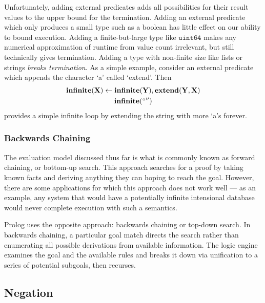Unfortunately, adding external predicates adds all possibilities for their result values to the upper bound for the termination.
Adding an external predicate which only produces a small type such as a boolean has little effect on our ability to bound execution.
Adding a finite-but-large type like $\texttt{uint64}$ makes any numerical approximation of runtime from value count irrelevant, but still technically gives termination.
Adding a type with non-finite size like lists or strings \emph{breaks termination}.
As a simple example, consider an external predicate which appends the character `a' called `extend'. Then
\begin{gather*}
  {\bf infinite}({\bf X}) \leftarrow {\bf infinite}({\bf Y}), {\bf extend}({\bf Y}, {\bf X})\\
  {\bf infinite}(``'')
\end{gather*}
provides a simple infinite loop by extending the string with more `a's forever.

\subsubsection{Backwards Chaining}
\label{sec:bchain}
The evaluation model discussed thus far is what is commonly known as forward chaining, or bottom-up search.
This approach searches for a proof by taking known facts and deriving anything they can hoping to reach the goal.
However, there are some applications for which this approach does not work well --- as an example, any system that would have a potentially infinite intensional database would never complete execution with such a semantics.

Prolog uses the opposite approach: backwards chaining or top-down search.
In backwards chaining, a particular goal match directs the search rather than enumerating all possible derivations from available information.
The logic engine examines the goal and the available rules and breaks it down via unification to a series of potential subgoals, then recurses.

\subsection{Negation}
